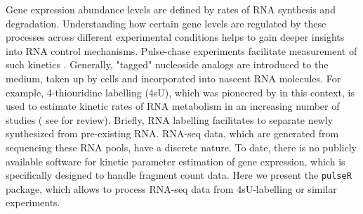 Gene expression abundance levels are defined by rates of RNA synthesis and degradation.
Understanding how certain gene levels are regulated by these processes across different
experimental conditions helps to gain deeper insights into RNA control mechanisms.
Pulse-chase experiments facilitate measurement of  such kinetics \citep{Wachutka2016}. 
Generally, "tagged" nucleoside analogs are introduced to the medium, 
taken up by cells and incorporated into nascent RNA molecules.
For example, 4-thiouridine labelling (4sU), which was pioneered by \cite{dolken2008high} in this context, is used to estimate 
kinetic rates of RNA metabolism in an increasing number of studies ( 
see \cite{Wachutka2016} for review). Briefly, RNA labelling facilitates to separate newly synthesized from pre-existing RNA.
RNA-seq data, which are generated from sequencing these RNA pools, have a discrete nature.
To date, there is no publicly available software for kinetic parameter estimation of gene expression, which is specifically designed to handle 
fragment count data. Here we present the \verb|pulseR| package, which allows to 
process RNA-seq data from 4sU-labelling or similar experiments.
